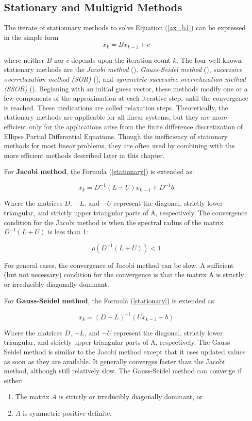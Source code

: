 \subsection{Stationary and Multigrid Methods}

The iterate of stationnary methods to solve Equation (\ref{ax=b1}) can be expressed in the simple form
\begin{equation}
\label{stationary}
x_k = Bx_{k-1}+c
\end{equation}

where neither $B$ nor $c$ depends upon the iteration count $k$. The four well-known stationary methods are the \textit{Jacobi method} (\cite{yang2014acceleration}), \textit{Gauss-Seidel method} (\cite{yoon1988lower}), \textit{successive overrelaxation method (SOR)} (\cite{adams1982multi}), and \textit{symmetric successive overrelaxation method (SSOR)} (\cite{axelsson1972generalized}). Beginning with an initial guess vector, these methods modify one or a few components of the approximation at each iterative step, until the convergence is reached. These medications are called relaxation steps. Theoretically, the stationary methods are applicable for all linear systems, but they are more efficient only for the applications arise from the finite difference discretization of Ellipse Partial Differential Equations. Though the inefficiency of stationary methods for most linear problems, they are often used by combining with the more efficient methods described later in this chapter.

For \textbf{Jacobi method}, the Formula (\ref{stationary}) is extended as:

\[x_k = D^{-1}(L+U)x_{k-1}+D^{-1}b\]

Where the matrices $D$, $-L$, and $-U$ represent the diagonal, strictly lower triangular, and strictly upper triangular parts of A, respectively. The convergence condition for the Jacobi method is when the spectral radius of the matrix $D^{-1}(L+U)$ is less than 1:

\[\rho(D^{-1}(L+U)) < 1\]

For general cases, the convergence of Jacobi method can be slow. A sufficient (but not necessary) condition for the convergence is that the matrix A is strictly or irreducibly diagonally dominant.

For \textbf{Gauss-Seidel method}, the Formula (\ref{stationary}) is extended as:

\[x_k = (D-L)^{-1}(Ux_{k-1}+b)\]

Where the matrices $D$, $-L$, and $-U$ represent the diagonal, strictly lower triangular, and strictly upper triangular parts of A, respectively. The Gauss-Seidel method is similar to the Jacobi method except that it uses updated values as soon as they are available. It generally converges faster than the Jacobi method, although still relatively slow. 
The Gauss-Seidel method can converge if either:
\begin{enumerate}
	\item The matrix $A$ is strictly or irreducibly diagonally dominant, or
	\item $A$ is symmetric positive-definite.
\end{enumerate}

